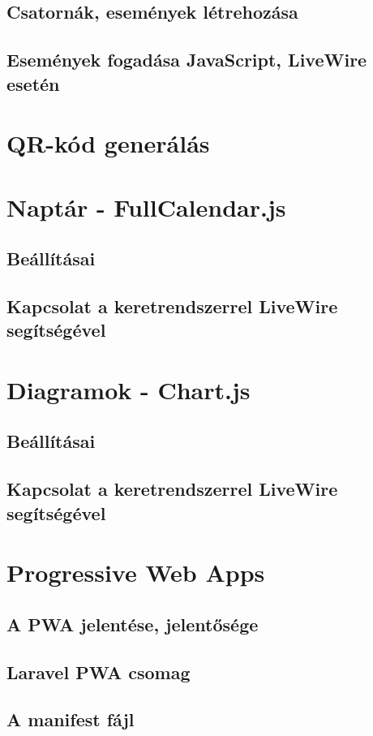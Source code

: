 \documentclass[
]{thesis-ekf}
\theoremstyle{definition}
\theoremstyle{remark}
\begin{document}
\subsection{Csatornák, események létrehozása}
\subsection{Események fogadása JavaScript, LiveWire esetén}

\section{QR-kód generálás}

\section{Naptár - FullCalendar.js}
\subsection{Beállításai}
\subsection{Kapcsolat a keretrendszerrel LiveWire segítségével}

\section{Diagramok - Chart.js}
\subsection{Beállításai}
\subsection{Kapcsolat a keretrendszerrel LiveWire segítségével}

\section{Progressive Web Apps}
\subsection{A PWA jelentése, jelentősége}
\subsection{Laravel PWA csomag}
\subsection{A manifest fájl}
\end{document}
